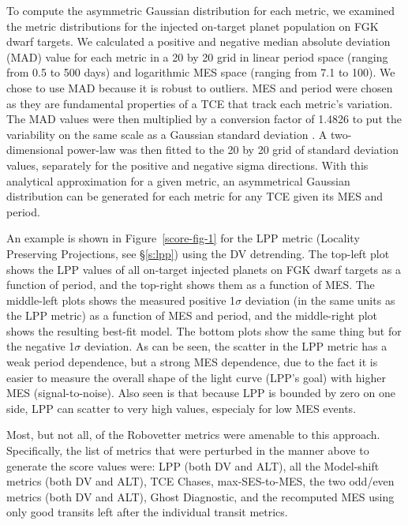 To compute the asymmetric Gaussian distribution for each metric, we examined the metric distributions for the injected on-target planet population on FGK dwarf targets. We calculated a positive and negative median absolute deviation (MAD) value for each metric in a 20 by 20 grid in linear period space (ranging from 0.5 to 500 days) and logarithmic MES space (ranging from 7.1 to 100). We chose to use MAD because it is robust to outliers. MES and period were chosen as they are fundamental properties of a TCE that track each metric's variation. The MAD values were then multiplied by a conversion factor of 1.4826 to put the variability on the same scale as a Gaussian standard deviation \citep{Hampel1974,Ruppert2010}. A two-dimensional power-law was then fitted to the 20 by 20 grid of standard deviation values, separately for the positive and negative sigma directions. With this analytical approximation for a given metric, an asymmetrical Gaussian distribution can be generated for each metric for any TCE given its MES and period.

An example is shown in Figure~\ref{score-fig-1} for the LPP metric (Locality Preserving Projections, see \S\ref{s:lpp}) using the DV detrending. The top-left plot shows the LPP values of all on-target injected planets on FGK dwarf targets as a function of period, and the top-right shows them as a function of MES. The middle-left plots shows the measured positive 1$\sigma$ deviation (in the same units as the LPP metric) as a function of MES and period, and the middle-right plot shows the resulting best-fit model. The bottom plots show the same thing but for the negative 1$\sigma$ deviation. As can be seen, the scatter in the LPP metric has a weak period dependence, but a strong MES dependence, due to the fact it is easier to measure the overall shape of the light curve (LPP's goal) with higher MES (signal-to-noise). Also seen is that because LPP is bounded by zero on one side, LPP can scatter to very high values, especialy for low MES events. 

Most, but not all, of the Robovetter metrics were amenable to this approach. Specifically, the list of metrics that were perturbed in the manner above to generate the score values were: LPP (both DV and ALT), all the Model-shift metrics (both DV and ALT), TCE Chases, max-SES-to-MES, the two odd/even metrics (both DV and ALT), Ghost Diagnostic, and the recomputed MES using only good transits left after the individual transit metrics.


